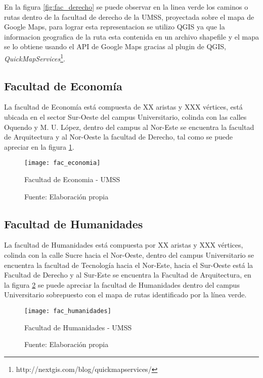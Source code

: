   En la figura \ref{fig:fac_derecho} se puede observar en la linea verde los caminos o rutas dentro de la facultad de derecho de la UMSS, proyectada sobre el mapa de Google Maps, para lograr esta representacion se utilizo QGIS ya que la informacion geografica de la ruta esta contenida en un archivo shapefile y el mapa se lo obtiene usando el API de Google Maps gracias al plugin de QGIS, \emph{QuickMapServices}\footnote{http://nextgis.com/blog/quickmapservices/}.


\subsection{Facultad de Economía}
\label{sub:facultad_economia}

La facultad de Economía está compuesta de XX aristas y XXX vértices, está ubicada en el sector Sur-Oeste del campus Universitario, colinda con las calles Oquendo y M. U. López, dentro del campus al Nor-Este se encuentra la facultad de Arquitectura y al Nor-Oeste la facultad de Derecho, tal como se puede apreciar en la figura \ref{fig:fac_economia}.

\begin{figure}[H]
  \begin{center}
    \texttt{[image: fac\_economia]}
    \caption{Facultad de Economia - UMSS}
    \label{fig:fac_economia}
    \caption*{Fuente: Elaboración propia}
  \end{center}
\end{figure}



\subsection{Facultad de Humanidades}
\label{sub:facultad_humanidades}

La facultad de Humanidades está compuesta por XX aristas y XXX vértices, colinda con la calle Sucre hacia el Nor-Oeste, dentro del campus Universitario se encuentra la facultad de Tecnología hacia el Nor-Este, hacia el Sur-Oeste está la Facultad de Derecho y al Sur-Este se encuentra la Facultad de Arquitectura, en la figura \ref{fig:fac_humanidades} se puede apreciar la facultad de Humanidades dentro del campus Universitario sobrepuesto con el mapa de rutas identificado por la línea verde.

\begin{figure}[H]
  \begin{center}
    \texttt{[image: fac\_humanidades]}
    \caption{Facultad de Humanidades - UMSS}
    \label{fig:fac_humanidades}
    \caption*{Fuente: Elaboración propia}
  \end{center}
\end{figure}


